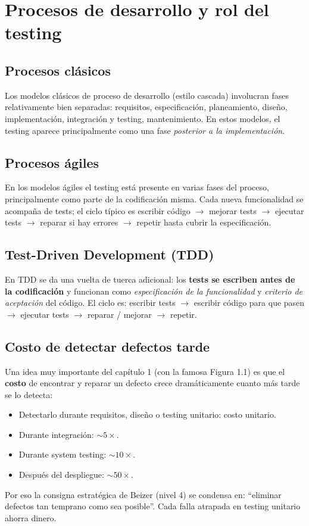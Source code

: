 \documentclass[12pt,a4paper]{article}
\begin{document}
\section{Procesos de desarrollo y rol del testing}
\subsection{Procesos clásicos}
Los modelos clásicos de proceso de desarrollo (estilo cascada) involucran fases relativamente bien separadas: requisitos, especificación, planeamiento, diseño, implementación, integración y testing, mantenimiento. En estos modelos, el testing aparece principalmente como una fase \textit{posterior a la implementación}.

\subsection{Procesos ágiles}
En los modelos ágiles el testing está presente en varias fases del proceso, principalmente como parte de la codificación misma. Cada nueva funcionalidad se acompaña de tests; el ciclo típico es escribir código $\to$ mejorar tests $\to$ ejecutar tests $\to$ reparar si hay errores $\to$ repetir hasta cubrir la especificación.

\subsection{Test-Driven Development (TDD)}
En TDD se da una vuelta de tuerca adicional: los \textbf{tests se escriben antes de la codificación} y funcionan como \textit{especificación de la funcionalidad} y \textit{criterio de aceptación} del código. El ciclo es: escribir tests $\to$ escribir código para que pasen $\to$ ejecutar tests $\to$ reparar / mejorar $\to$ repetir.

\subsection{Costo de detectar defectos tarde}
Una idea muy importante del capítulo 1 (con la famosa Figura 1.1) es que el \textbf{costo} de encontrar y reparar un defecto crece dramáticamente cuanto más tarde se lo detecta:
\begin{itemize}
  \item Detectarlo durante requisitos, diseño o testing unitario: costo unitario.
  \item Durante integración: $\sim 5\times$.
  \item Durante system testing: $\sim 10\times$.
  \item Después del despliegue: $\sim 50\times$.
\end{itemize}
Por eso la consigna estratégica de Beizer (nivel 4) se condensa en: ``eliminar defectos tan temprano como sea posible''. Cada falla atrapada en testing unitario ahorra dinero.
\end{document}
